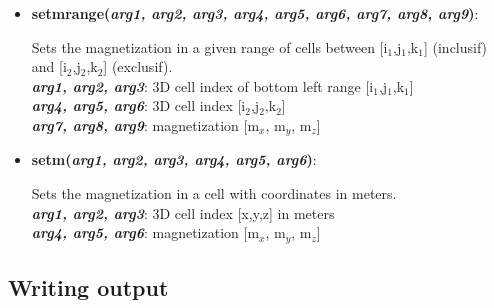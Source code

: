 \begin{itemize}
 \item {\vspace{-0.4cm}\textbf{setmrange(\textit{arg1, arg2, arg3, arg4, arg5, arg6, arg7, arg8, arg9})}:
				\flushright\parbox{0.9 \textwidth}{\vspace{-0.25cm} 
				Sets the magnetization in a given range of cells between [i$_1$,j$_1$,k$_1$] (inclusif) and [i$_2$,j$_2$,k$_2$] (exclusif).\\
				\textbf{\textit{arg1, arg2, arg3}}: 3D cell index of bottom left range [i$_1$,j$_1$,k$_1$]\\
				\textbf{\textit{arg4, arg5, arg6}}: 3D cell index [i$_2$,j$_2$,k$_2$]\\
				\textbf{\textit{arg7, arg8, arg9}}: magnetization [m$_x$, m$_y$, m$_z$]
				}\flushleft}

 \item {\vspace{-0.4cm}\textbf{setm(\textit{arg1, arg2, arg3, arg4, arg5, arg6})}:
				\flushright\parbox{0.9 \textwidth}{\vspace{-0.25cm} 
				Sets the magnetization in a cell with coordinates in meters.\\
				\textbf{\textit{arg1, arg2, arg3}}: 3D cell index [x,y,z] in meters\\
				\textbf{\textit{arg4, arg5, arg6}}: magnetization [m$_x$, m$_y$, m$_z$]
				}\flushleft}

\end{itemize}


\subsection{Writing output}

